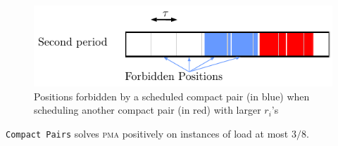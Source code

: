 \documentclass[a4paper,UKenglish,cleveref, autoref, thm-restate]{lipics-v2019}
\newcommand\pma{\textsc{pma}\xspace}
\newcommand\compactpair{\texttt{Compact Pairs}\xspace}
\begin{document}
\begin{figure}
\begin{center}
\includegraphics[scale=0.7]{pairforbiden}
\end{center}

\caption{Positions forbidden by a scheduled compact pair (in blue) when scheduling another compact pair (in red) with larger $r_i$'s} 
\label{fig:forbidenmeta}
\end{figure}
\begin{theorem}
\compactpair solves \pma positively on instances of load at most $3/8$.
\end{theorem}
\end{document}
